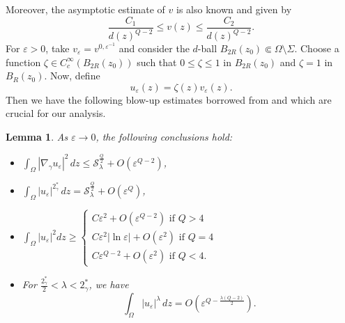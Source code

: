 \documentclass[11pt]{article}
\newtheorem{lemma}{Lemma}[section] %
\newcommand{\grad}{\nabla}
\begin{document}
Moreover, the asymptotic estimate of $v$ is also known and given by 
\begin{equation}\label{eq:asymptotic_estimate_fundamental}
    \frac{C_1}{d(z)^{Q-2}} \leq v(z) \leq \frac{C_2}{d(z)^{Q-2}}.
\end{equation}
  For $\varepsilon > 0$, take $v_{\varepsilon} = v^{0, \varepsilon^{-1}}$ and consider the $d$-ball $B_{2R}(z_0) \Subset \Omega \setminus \Sigma$. Choose a function $\zeta \in C_c^\infty(B_{2R}(z_0))$ such that $0 \le \zeta \le 1$ in $B_{2R}(z_0)$ and $\zeta = 1$ in $B_R(z_0)$. Now, define
\begin{equation}\label{eq:grushin_bubbles}
    u_\varepsilon(z) = \zeta(z)v_\varepsilon(z). 
\end{equation}
Then we have the following blow-up estimates borrowed from \cite[Proposition $4.2$]{alves_tyagi_brezis-nirenberg} and \cite[Proposition $0.4$]{sanjit_bal2024multiplicity} which are crucial for our analysis. 

\begin{lemma}\label{lem:blow_up_grushin}
As $\varepsilon \to 0$, the following conclusions hold:
\begin{itemize}
    \item[(i)] $\displaystyle \int_\Omega |\grad_\gamma u_\varepsilon|^2 \, dz \le \mathcal{S}_\lambda^{\frac{Q}{2}} + O(\varepsilon^{Q-2})$,
    \item[(ii)] $\displaystyle \int_\Omega |u_\varepsilon|^{2_\gamma^*} \, dz = \mathcal{S}_\lambda^{\frac{Q}{2}} + O(\varepsilon^Q)$,
    \item[(iii)] $\displaystyle \int_\Omega |u_\varepsilon|^2 dz \ge \begin{cases} 
        C\varepsilon^2 + O(\varepsilon^{Q-2}) \text{ if } Q > 4 \\
        C\varepsilon^2 |\ln \varepsilon| + O(\varepsilon^2) \text{ if } Q = 4 \\
        C\varepsilon^{Q-2} + O(\varepsilon^2) \text{ if } Q < 4.
    \end{cases}$
    \item[(iv)] For $\frac{2_\gamma^*}{2} < \lambda < 2_\gamma^*$, we have
    \[
        \int_\Omega |u_\varepsilon|^\lambda \, dz = O(\varepsilon^{Q - \frac{\lambda(Q-2)}{2}}).
    \]
\end{itemize}
\end{lemma}
\end{document}
